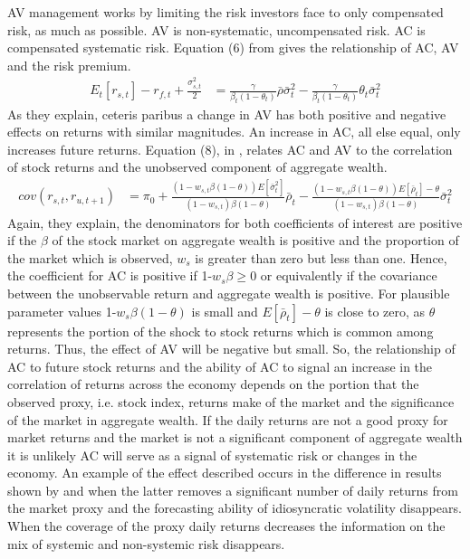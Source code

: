 AV management works by limiting the risk investors face to only compensated risk, as much as possible. AV is non-systematic, uncompensated risk. AC is compensated systematic risk. Equation (6) from \citet{pollet_average_2010} gives the relationship of AC, AV and the risk premium.
\begin{align*}
	E_{t}[r_{s,t}] - r_{f,t} + \frac{\sigma^{2}_{s,t}}{2} &= \frac{\gamma}{\beta_{t}(1-\theta_{t})}\bar{\rho}\bar{\sigma}^{2}_{t} - \frac{\gamma}{\beta_{t}(1-\theta_{t})}\theta_{t}\bar{\sigma}^{2}_{t}
\end{align*}
As they explain, ceteris paribus a change in AV has both positive and negative effects on returns with similar magnitudes. An increase in AC, all else equal, only increases future returns. Equation (8), in \cite{pollet_average_2010}, relates AC and AV to the correlation of stock returns and the unobserved component of aggregate wealth.
\begin{align*}
cov(r_{s,t},r_{u,t+1}) &= \pi_{0} + \frac{(1-w_{s,t}\beta(1-\theta))E[\bar{\sigma}^{2}_{t}]}{(1-w_{s,t})\beta(1-\theta)}\bar{\rho}_{t}- \frac{(1-w_{s,t}\beta(1-\theta))E[\bar{\rho}_{t}]-\theta}{(1-w_{s,t})\beta(1-\theta)}\bar{\sigma}^{2}_{t}
\end{align*}
Again, they explain, the denominators for both coefficients of interest are positive if the $\beta$ of the stock market on aggregate wealth is positive and the proportion of the market which is observed, $w_{s}$ is greater than zero but less than one. Hence, the coefficient for AC is positive if 1-$w_{s}\beta \geq 0$ or equivalently if the covariance between the unobservable return and aggregate wealth is positive. For plausible parameter values 1-$w_{s}\beta(1-\theta)$ is small and $E[\bar{\rho}_{t}]-\theta$ is close to zero, as $\theta$ represents the portion of the shock to stock returns which is common among returns. Thus, the effect of AV will be negative but small. So, the relationship of AC to future stock returns and the ability of AC to signal an increase in the correlation of returns across the economy depends on the portion that the observed proxy, i.e. stock index, returns make of the market and the significance of the market in aggregate wealth. If the daily returns are not a good proxy for market returns and the market is not a significant component of aggregate wealth it is unlikely AC will serve as a signal of systematic risk or changes in the economy. An example of the effect described occurs in the difference in results shown by \citet{goyal_idiosyncratic_2003} and \citet{bali_does_nodate} when the latter removes a significant number of daily returns from the market proxy and the forecasting ability of idiosyncratic volatility disappears. When the coverage of the proxy daily returns decreases the information on the mix of systemic and non-systemic risk disappears.


